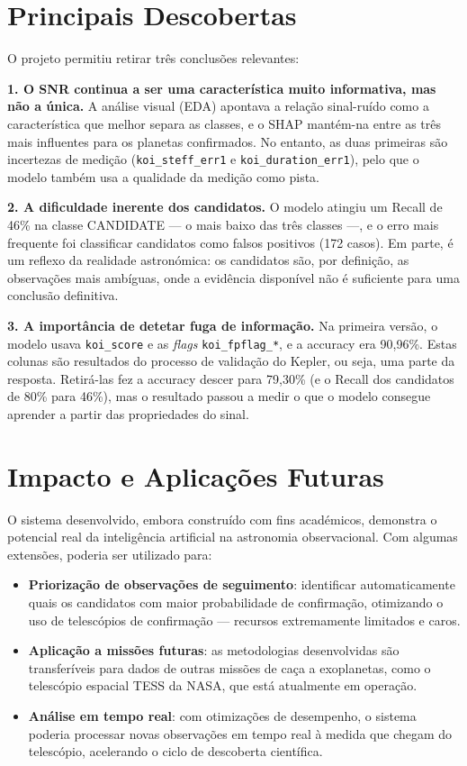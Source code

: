 \documentclass[12pt, a4paper]{report}
\begin{document}
\section{Principais Descobertas}

O projeto permitiu retirar três conclusões relevantes:

\textbf{1. O SNR continua a ser uma característica muito informativa, mas não a única.} A análise visual (EDA) apontava a relação sinal-ruído como a característica que melhor separa as classes, e o SHAP mantém-na entre as três mais influentes para os planetas confirmados. No entanto, as duas primeiras são incertezas de medição (\texttt{koi\_steff\_err1} e \texttt{koi\_duration\_err1}), pelo que o modelo também usa a qualidade da medição como pista.

\textbf{2. A dificuldade inerente dos candidatos.} O modelo atingiu um Recall de 46\% na classe CANDIDATE — o mais baixo das três classes —, e o erro mais frequente foi classificar candidatos como falsos positivos (172 casos). Em parte, é um reflexo da realidade astronómica: os candidatos são, por definição, as observações mais ambíguas, onde a evidência disponível não é suficiente para uma conclusão definitiva.

\textbf{3. A importância de detetar fuga de informação.} Na primeira versão, o modelo usava \texttt{koi\_score} e as \textit{flags} \texttt{koi\_fpflag\_*}, e a accuracy era 90,96\%. Estas colunas são resultados do processo de validação do Kepler, ou seja, uma parte da resposta. Retirá-las fez a accuracy descer para 79,30\% (e o Recall dos candidatos de 80\% para 46\%), mas o resultado passou a medir o que o modelo consegue aprender a partir das propriedades do sinal.

\section{Impacto e Aplicações Futuras}

O sistema desenvolvido, embora construído com fins académicos, demonstra o potencial real da inteligência artificial na astronomia observacional. Com algumas extensões, poderia ser utilizado para:

\begin{itemize}
    \item \textbf{Priorização de observações de seguimento}: identificar automaticamente quais os candidatos com maior probabilidade de confirmação, otimizando o uso de telescópios de confirmação — recursos extremamente limitados e caros.

    \item \textbf{Aplicação a missões futuras}: as metodologias desenvolvidas são transferíveis para dados de outras missões de caça a exoplanetas, como o telescópio espacial TESS da NASA, que está atualmente em operação.

    \item \textbf{Análise em tempo real}: com otimizações de desempenho, o sistema poderia processar novas observações em tempo real à medida que chegam do telescópio, acelerando o ciclo de descoberta científica.
\end{itemize}
\end{document}
